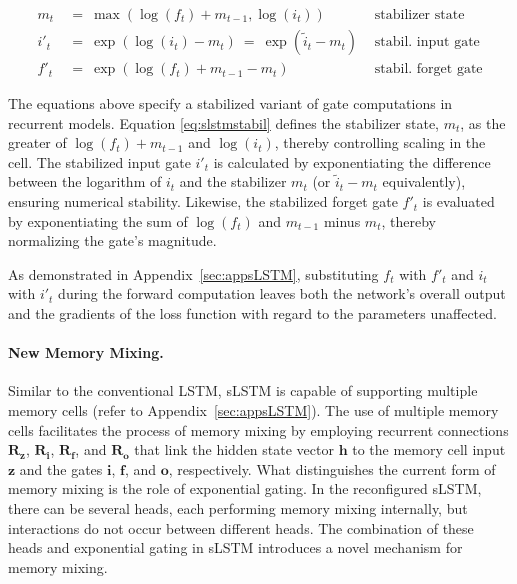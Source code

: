 \begin{align}
\label{eq:slstmstabil}
m_t \ &= \ \max \left( \log ( f_t ) + m_{t-1} , \log ( i_t ) \right) &\text{stabilizer state} \\
i'_t \ &= \ \!\exp \left( \log \left ( i_t \right) - m_t \right) \ = \ \!\exp \left( \tilde{i}_t - m_t \right) \ \, 
  &\text{stabil. input gate} \\
f'_t \ &= \ \!\exp \left( \log \left( f_t \right) + m_{t-1} - m_t \right) \ \, 
  &\text{stabil. forget gate}
\end{align}

\noindent

The equations above specify a stabilized variant of gate computations in recurrent models. Equation \eqref{eq:slstmstabil} defines the stabilizer state, $m_t$, as the greater of $\log(f_t) + m_{t-1}$ and $\log(i_t)$, thereby controlling scaling in the cell. The stabilized input gate $i'_t$ is calculated by exponentiating the difference between the logarithm of $i_t$ and the stabilizer $m_t$ (or $\tilde{i}_t - m_t$ equivalently), ensuring numerical stability. Likewise, the stabilized forget gate $f'_t$ is evaluated by exponentiating the sum of $\log(f_t)$ and $m_{t-1}$ minus $m_t$, thereby normalizing the gate's magnitude.

As demonstrated in Appendix~\ref{sec:appsLSTM}, substituting $f_t$ with $f'_t$ and $i_t$ with $i'_t$ during the forward computation leaves both the network’s overall output and the gradients of the loss function with regard to the parameters unaffected.

\paragraph{New Memory Mixing.} Similar to the conventional LSTM, sLSTM is capable of supporting multiple memory cells (refer to Appendix~\ref{sec:appsLSTM}). The use of multiple memory cells facilitates the process of memory mixing by employing recurrent connections $\mathbf{R}_{\mathbf{z}}$, $\mathbf{R}_{\mathbf{i}}$, $\mathbf{R}_{\mathbf{f}}$, and $\mathbf{R}_{\mathbf{o}}$ that link the hidden state vector $\mathbf{h}$ to the memory cell input $\mathbf{z}$ and the gates $\mathbf{i}$, $\mathbf{f}$, and $\mathbf{o}$, respectively. What distinguishes the current form of memory mixing is the role of exponential gating. In the reconfigured sLSTM, there can be several heads, each performing memory mixing internally, but interactions do not occur between different heads. The combination of these heads and exponential gating in sLSTM introduces a novel mechanism for memory mixing.

